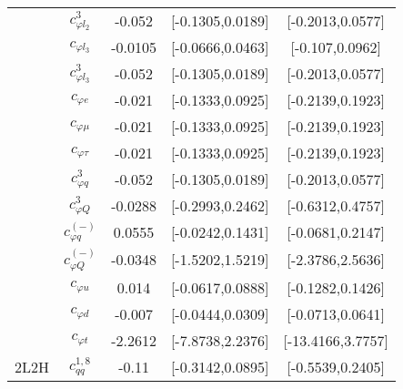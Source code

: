 \documentclass{article}
\begin{document}
\begin{table}[H]
\begin{tabular}{|c|c|c|c|c|}
 & $c_{\varphi l_2}^{3}$ & -0.052                             & [-0.1305,0.0189]                                 & [-0.2013,0.0577] \\ \cline{2-5}
 & $c_{\varphi l_3}$ & -0.0105                             & [-0.0666,0.0463]                                 & [-0.107,0.0962] \\ \cline{2-5}
 & $c_{\varphi l_3}^{3}$ & -0.052                             & [-0.1305,0.0189]                                 & [-0.2013,0.0577] \\ \cline{2-5}
 & $c_{\varphi e}$ & -0.021                             & [-0.1333,0.0925]                                 & [-0.2139,0.1923] \\ \cline{2-5}
 & $c_{\varphi \mu}$ & -0.021                             & [-0.1333,0.0925]                                 & [-0.2139,0.1923] \\ \cline{2-5}
 & $c_{\varphi \tau}$ & -0.021                             & [-0.1333,0.0925]                                 & [-0.2139,0.1923] \\ \cline{2-5}
 & $c_{\varphi q}^{3}$ & -0.052                             & [-0.1305,0.0189]                                 & [-0.2013,0.0577] \\ \cline{2-5}
 & $c_{\varphi Q}^{3}$ & -0.0288                             & [-0.2993,0.2462]                                 & [-0.6312,0.4757] \\ \cline{2-5}
 & $c_{\varphi q}^{(-)}$ & 0.0555                             & [-0.0242,0.1431]                                 & [-0.0681,0.2147] \\ \cline{2-5}
 & $c_{\varphi Q}^{(-)}$ & -0.0348                             & [-1.5202,1.5219]                                 & [-2.3786,2.5636] \\ \cline{2-5}
 & $c_{\varphi u}$ & 0.014                             & [-0.0617,0.0888]                                 & [-0.1282,0.1426] \\ \cline{2-5}
 & $c_{\varphi d}$ & -0.007                             & [-0.0444,0.0309]                                 & [-0.0713,0.0641] \\ \cline{2-5}
 & $c_{\varphi t}$ & -2.2612                             & [-7.8738,2.2376]                                 & [-13.4166,3.7757] \\ \cline{2-5}
\hline
\multirow{14}{*}{2L2H}
 & $c_{qq}^{1,8}$ & -0.11                             & [-0.3142,0.0895]                                 & [-0.5539,0.2405] \\ \cline{2-5}

\end{tabular}
\end{table}
\end{document}
